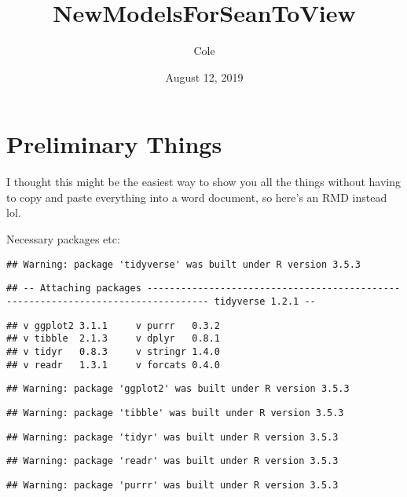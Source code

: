 \documentclass[]{article}
\title{NewModelsForSeanToView}
\author{Cole}
\date{August 12, 2019}
\begin{document}
\maketitle

{
\setcounter{tocdepth}{2}
\tableofcontents
}
\section{Preliminary Things}\label{preliminary-things}

I thought this might be the easiest way to show you all the things
without having to copy and paste everything into a word document, so
here's an RMD instead lol.

Necessary packages etc:

\begin{verbatim}
## Warning: package 'tidyverse' was built under R version 3.5.3
\end{verbatim}

\begin{verbatim}
## -- Attaching packages --------------------------------------------------------------------------------- tidyverse 1.2.1 --
\end{verbatim}

\begin{verbatim}
## v ggplot2 3.1.1     v purrr   0.3.2
## v tibble  2.1.3     v dplyr   0.8.1
## v tidyr   0.8.3     v stringr 1.4.0
## v readr   1.3.1     v forcats 0.4.0
\end{verbatim}

\begin{verbatim}
## Warning: package 'ggplot2' was built under R version 3.5.3
\end{verbatim}

\begin{verbatim}
## Warning: package 'tibble' was built under R version 3.5.3
\end{verbatim}

\begin{verbatim}
## Warning: package 'tidyr' was built under R version 3.5.3
\end{verbatim}

\begin{verbatim}
## Warning: package 'readr' was built under R version 3.5.3
\end{verbatim}

\begin{verbatim}
## Warning: package 'purrr' was built under R version 3.5.3
\end{verbatim}
\end{document}
